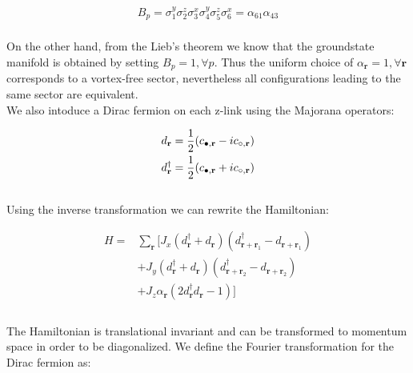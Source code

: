 \documentclass{article}
\begin{document}
\begin{equation}\label{eq:10}
	\begin{aligned}
		B_p = \sigma^y_1\sigma^z_2\sigma^x_3\sigma^y_4\sigma^z_5\sigma^x_6 = \alpha_{61}\alpha_{43}\\
	\end{aligned}
\end{equation}

\noindent On the other hand, from the Lieb's theorem \cite{Lieb} we know that the groundstate manifold is obtained by setting $B_p = 1, \forall p$. 
Thus the uniform choice of $\alpha_\textbf{r}=1, \forall \textbf{r}$ corresponds to a vortex-free sector, nevertheless all configurations leading to the same sector are equivalent.\\

\noindent We also intoduce a Dirac fermion on each z-link using the Majorana operators:

\begin{equation}\label{eq:11}
	\begin{aligned}
		d_\textbf{r} &= \frac{1}{2} (c_{\color{black}\bullet,\textbf{r}} - ic_{\circ,\textbf{r}})\\
		d^\dagger_\textbf{r} &= \frac{1}{2} (c_{\color{black}\bullet,\textbf{r}} + ic_{\circ,\textbf{r}})
	\end{aligned}
\end{equation}\\

\noindent Using the inverse transformation we can rewrite the Hamiltonian:

\begin{equation}\label{eq:12}
	\begin{aligned}
		H= &\sum_{\textbf{r}}[J_x (d^\dagger_{\textbf{r}} + d_{\textbf{r}})(d^\dagger_{\textbf{r}+\textbf{r}_1} - d_{\textbf{r}+\textbf{r}_1}) \\
		&+J_y (d^\dagger_{\textbf{r}} + d_{\textbf{r}})(d^\dagger_{\textbf{r}+\textbf{r}_2} - d_{\textbf{r}+\textbf{r}_2}) \\
		&+J_z \alpha_\textbf{r}(2d^\dagger_{\textbf{r}}d_{\textbf{r}}-1)]\\ 
	\end{aligned}
\end{equation}\\

\noindent The Hamiltonian is translational invariant and can be transformed to momentum space in order to be diagonalized. We define the Fourier transformation for the Dirac fermion as:
\end{document}
